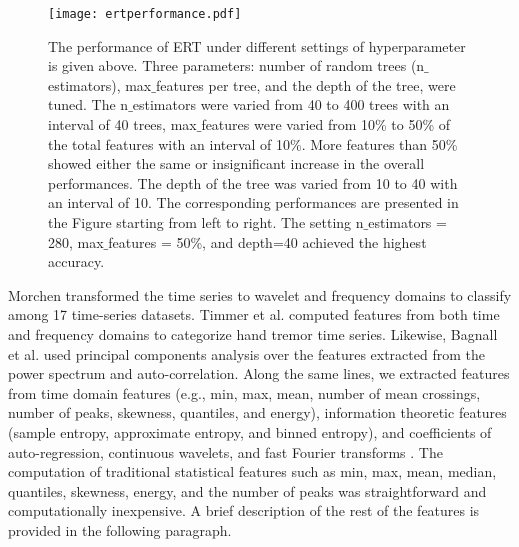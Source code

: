 \documentclass[conference]{IEEEtran}
\begin{document}
\begin{figure*}[htp]
\centerline{\texttt{[image: ertperformance.pdf]}}
\vspace{-0.05in}
\caption{The performance of ERT under different settings of hyperparameter is given above. Three parameters: number of random trees (n$\_$estimators), max$\_$features per tree, and the depth of the tree, were tuned. The n$\_$estimators were varied from 40 to 400 trees with an interval of 40 trees, max$\_$features were varied from 10\% to 50\% of the total features with an interval of 10\%. More features than 50\% showed either the same or insignificant increase in the overall performances. The depth of the tree was varied from 10 to 40 with an interval of 10. The corresponding performances are presented in the Figure starting from left to right. The setting n$\_$estimators = 280, max$\_$features = 50\%, and depth=40 achieved the highest accuracy.}
\label{ertperformance}
\end{figure*}
Morchen \cite{MorchenTimeSeriesFeat} transformed the time series to wavelet and frequency domains to classify among 17 time-series datasets. Timmer et al. \cite{TimmerTimeSeriesFeat} computed features from both time and frequency domains to categorize hand tremor time series. Likewise, Bagnall et al. \cite{BagnallTimeSeriesFeat} used principal components analysis over the features extracted from the power spectrum and auto-correlation. Along the same lines, we extracted features from time domain features (e.g., min, max, mean, number of mean crossings, number of peaks, skewness, quantiles, and energy), information theoretic features (sample entropy, approximate entropy, and binned entropy), and coefficients of auto-regression, continuous wavelets, and fast Fourier transforms \cite{SuccessfulFeatTimeSeries,TSFresh}. The computation of traditional statistical features such as min, max, mean, median, quantiles, skewness, energy, and the number of peaks was straightforward and computationally inexpensive. A brief description of the rest of the features is provided in the following paragraph.
\end{document}
